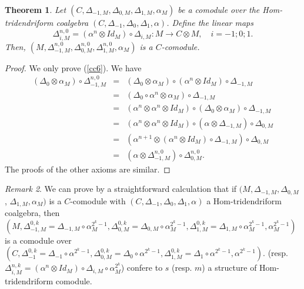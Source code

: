 \documentclass{article}
\newtheorem{thm}{Theorem}[section]
\theoremstyle{definition}
\theoremstyle{remark}
\newtheorem{rem}[thm]{Remark}
\numberwithin{equation}{section}
\begin{document}
 \begin{thm}
  Let $(C, \Delta_{-1, M}, \Delta_{0, M}, \Delta_{1, M}, \alpha_M)$ be a comodule over the Hom-tridendriform coalgebra
 $(C, \Delta_{-1}, \Delta_0, \Delta_1, \alpha)$.
 Define the linear maps
 $$\Delta_{i, M}^{n, 0}=(\alpha^n\otimes Id_M)\circ\Delta_{i, M} : M\rightarrow C\otimes M, \quad i=-1; 0; 1.$$
 Then, $(M, \Delta_{-1, M}^{n, 0}, \Delta_{0, M}^{n, 0}, \Delta_{1, M}^{n, 0}, \alpha_M)$ is a $C$-comodule.
 \end{thm}
 \begin{proof}
 We only prove (\ref{cc6}). We have
  \begin{eqnarray}
   (\Delta_0\otimes\alpha_M)\circ\Delta_{-1, M}^{n, 0}
 &=&(\Delta_0\otimes\alpha_M)\circ(\alpha^n\otimes Id_M)\circ\Delta_{-1, M}\nonumber\\
 &=&(\Delta_0\circ\alpha^n\otimes\alpha_M)\circ\Delta_{-1, M}\nonumber\\
 &=&(\alpha^n\otimes\alpha^n\otimes Id_M)\circ(\Delta_0\otimes\alpha_M)\circ\Delta_{-1, M}\nonumber\\
 &=&(\alpha^n\otimes\alpha^n\otimes Id_M)\circ(\alpha\otimes\Delta_{-1, M})\circ\Delta_{0, M}\nonumber\\
 &=&(\alpha^{n+1}\otimes(\alpha^n\otimes Id_M)\circ\Delta_{-1, M})\circ\Delta_{0, M}\nonumber\\
 &=&(\alpha\otimes\Delta_{-1, M}^{n, 0})\circ\Delta_{0, M}^{n, 0}.\nonumber
 \end{eqnarray}
 The proofs of the other axioms are similar.
 \end{proof}
 
 \begin{rem}
 We can prove by a straightforward calculation that if $(M, \Delta_{-1, M}, \Delta_{0, M}$, $ \Delta_{1, M}, \alpha_M)$ is a $C$-comodule 
 with $(C, \Delta_{-1}, \Delta_0, \Delta_1, \alpha)$ a Hom-tridendriform coalgebra,
 then $(M, \Delta_{-1, M}^{0, k}=\Delta_{-1, M}\circ\alpha_M^{2^k-1}, \Delta_{0, M}^{0, k}=\Delta_{0, M}\circ\alpha_M^{2^k-1}, 
 \Delta_{1, M}^{0, k}=\Delta_{1, M}\circ\alpha_M^{2^k-1}, \alpha_M^{2^k-1})$ is a comodule over 
 $(C, \Delta_{-1}^{0, k}=\Delta_{-1}\circ\alpha^{2^k-1}, \Delta_{0, M}^{0, k}=\Delta_0\circ\alpha^{2^k-1}, 
 \Delta_{1, M}^{0, k}=\Delta_1\circ\alpha^{2^k-1}, \alpha^{2^k-1})$.
 (resp. $\Delta_{i, M}^{n, k}=(\alpha^n\otimes Id_M)\circ\Delta_{i, M}\circ\alpha_M^{2^k}$)
 confere to $s$ (resp. $m$) a structure  of Hom-tridendriform comodule.
 \end{rem}
 
\end{document}
